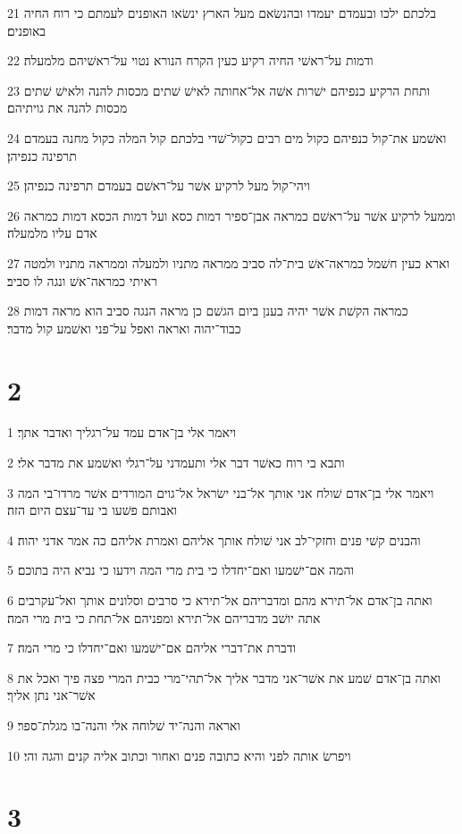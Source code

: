 \par 21 בלכתם ילכו ובעמדם יעמדו ובהנשׂאם מעל הארץ ינשׂאו האופנים לעמתם כי רוח החיה באופנים׃
\par 22 ודמות על־ראשׁי החיה רקיע כעין הקרח הנורא נטוי על־ראשׁיהם מלמעלה׃
\par 23 ותחת הרקיע כנפיהם ישׁרות אשׁה אל־אחותה לאישׁ שׁתים מכסות להנה ולאישׁ שׁתים מכסות להנה את גויתיהם׃
\par 24 ואשׁמע את־קול כנפיהם כקול מים רבים כקול־שׁדי בלכתם קול המלה כקול מחנה בעמדם תרפינה כנפיהן׃
\par 25 ויהי־קול מעל לרקיע אשׁר על־ראשׁם בעמדם תרפינה כנפיהן׃
\par 26 וממעל לרקיע אשׁר על־ראשׁם כמראה אבן־ספיר דמות כסא ועל דמות הכסא דמות כמראה אדם עליו מלמעלה׃
\par 27 וארא כעין חשׁמל כמראה־אשׁ בית־לה סביב ממראה מתניו ולמעלה וממראה מתניו ולמטה ראיתי כמראה־אשׁ ונגה לו סביב׃
\par 28 כמראה הקשׁת אשׁר יהיה בענן ביום הגשׁם כן מראה הנגה סביב הוא מראה דמות כבוד־יהוה ואראה ואפל על־פני ואשׁמע קול מדבר׃

\chapter{2}

\par 1 ויאמר אלי בן־אדם עמד על־רגליך ואדבר אתך׃
\par 2 ותבא בי רוח כאשׁר דבר אלי ותעמדני על־רגלי ואשׁמע את מדבר אלי׃
\par 3 ויאמר אלי בן־אדם שׁולח אני אותך אל־בני ישׂראל אל־גוים המורדים אשׁר מרדו־בי המה ואבותם פשׁעו בי עד־עצם היום הזה׃
\par 4 והבנים קשׁי פנים וחזקי־לב אני שׁולח אותך אליהם ואמרת אליהם כה אמר אדני יהוה׃
\par 5 והמה אם־ישׁמעו ואם־יחדלו כי בית מרי המה וידעו כי נביא היה בתוכם׃
\par 6 ואתה בן־אדם אל־תירא מהם ומדבריהם אל־תירא כי סרבים וסלונים אותך ואל־עקרבים אתה יושׁב מדבריהם אל־תירא ומפניהם אל־תחת כי בית מרי המה׃
\par 7 ודברת את־דברי אליהם אם־ישׁמעו ואם־יחדלו כי מרי המה׃
\par 8 ואתה בן־אדם שׁמע את אשׁר־אני מדבר אליך אל־תהי־מרי כבית המרי פצה פיך ואכל את אשׁר־אני נתן אליך׃
\par 9 ואראה והנה־יד שׁלוחה אלי והנה־בו מגלת־ספר׃
\par 10 ויפרשׂ אותה לפני והיא כתובה פנים ואחור וכתוב אליה קנים והגה והי׃

\chapter{3}

